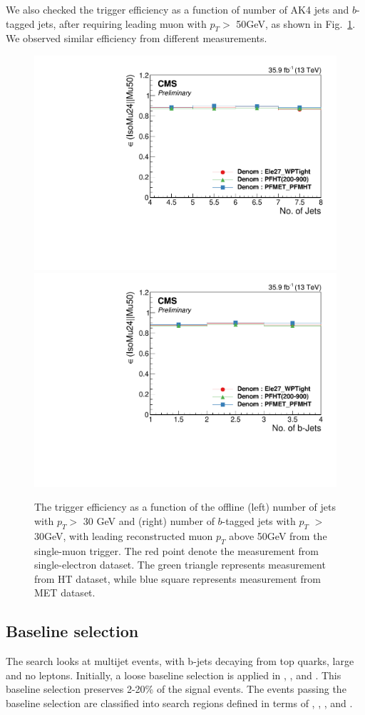 We also checked the trigger efficiency as a function of number of AK4 jets and
$b$-tagged jets, after requiring leading muon with $p_{T}>$ 50GeV, as shown in
Fig.~\ref{fig:TrigMuonJets}. We observed similar efficiency from different
measurements.
\begin{figure}[tbp]
 \begin{center}
   \includegraphics[width=0.49\linewidth]{sections/mc4/EvtSelSBOpt/figures/MuonNJets.pdf}
   \includegraphics[width=0.49\linewidth]{sections/mc4/EvtSelSBOpt/figures/MuonNBs.pdf}
   \caption{ The trigger efficiency as a function of the offline (left) number
		 of jets with $p_{T}>$ 30 GeV and (right) number of $b$-tagged jets with $p_{T}$
		 $>$ 30GeV, with leading reconstructed muon $p_{T}$ above 50GeV from the
   single-muon trigger. The red point denote the measurement from
   single-electron dataset. The green triangle represents measurement from HT
   dataset, while blue square represents measurement from MET dataset.}
   \label{fig:TrigMuonJets}
 \end{center}
\end{figure}

\subsection{Baseline selection}
\label{sec:baselineselection}

The search looks at multijet events, with b-jets decaying from top quarks, 
large \MET and no leptons. Initially, a loose baseline selection is applied 
in \MET, \HT, \njets and \nbjets.
This baseline selection preserves 2-20\% of the signal events. 
The events passing the baseline selection are classified into search regions
defined in terms of \ntops, \nbjets, \MET, \HT and \MTTwo.

